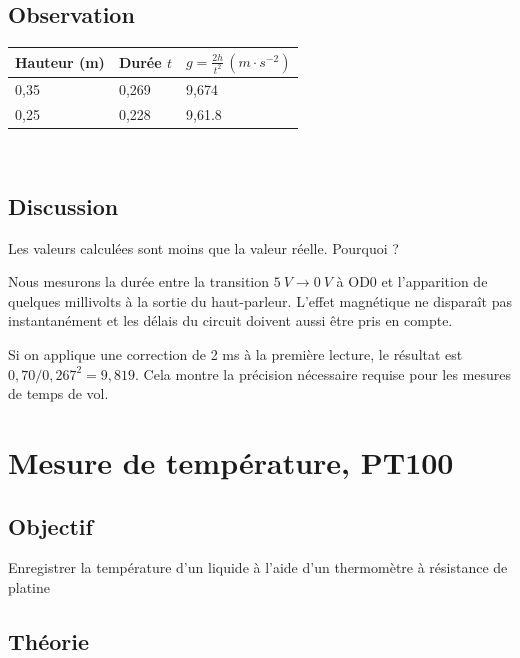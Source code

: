 \documentclass{book}
\begin{document}
\subsection{Observation}


\begin{tabular}{|l|l|l|}
\hline
\textbf{Hauteur (m)}&\textbf{Durée $t$}&\textbf{$g=\frac{2h}{t^{2} }\,(m\cdot s^{-2})$}
\\ \hline
0,35&0,269&9,674
\\ \hline
0,25&0,228&9,61.8
\\ \hline
\end{tabular}\\[0.5em]

\subsection{Discussion}


Les valeurs calculées sont moins que la valeur réelle. Pourquoi ?



Nous mesurons la durée entre la transition $5\ V \rightarrow 0\ V$ à OD0 et l'apparition de quelques millivolts à la sortie du haut-parleur. L'effet magnétique ne disparaît pas instantanément et les délais du circuit doivent aussi être pris en compte.



Si on applique une correction de 2 ms à la première lecture, le résultat est $0,70/0,267^{2}=9,819$. Cela montre la précision nécessaire requise pour les mesures de temps de vol.







\section{Mesure de température, PT100}



\subsection{Objectif}


Enregistrer la température d'un liquide à l'aide d'un thermomètre à résistance de platine

\subsection{Théorie}
\end{document}
